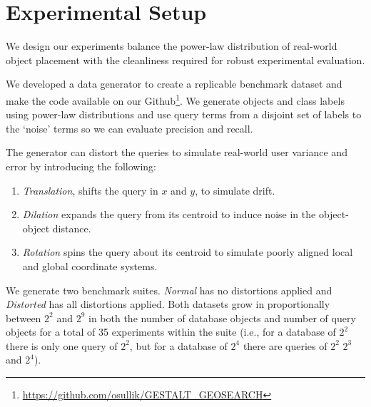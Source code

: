 \section{Experimental Setup}
\label{section:experimental_setup}


\par{
    We design our experiments balance the power-law distribution of real-world object placement with the cleanliness required for robust experimental evaluation. 
    }  
    
\par{
    We developed a data generator to create a replicable benchmark dataset and make the code available on our Github\footnote{\url{https://github.com/osullik/GESTALT_GEOSEARCH}}. We generate objects and class labels using power-law distributions and use query terms from a disjoint set of labels to the `noise' terms so we can evaluate precision and recall.
    }
   
\par{
    The generator can distort the queries to simulate real-world user variance and error by introducing the following:
    \begin{enumerate}
        \item \textit{Translation}, shifts the query in $x$ and $y$, to simulate drift.
        \item \textit{Dilation} expands the query from its centroid to induce noise in the object-object distance.
        \item \textit{Rotation} spins the query about its centroid to simulate poorly aligned local and global coordinate systems.
    \end{enumerate}
    }
\par{
    We generate two benchmark suites. \textit{Normal} has no distortions applied and \textit{Distorted} has all distortions applied. 
    Both datasets grow in proportionally between $2^2$ and $2^9$ in both the number of database objects and number of query objects for a total of 35 experiments within the suite (i.e., for a database of $2^2$ there is only one query of $2^2$, but for a database of $2^4$ there are queries of $2^2$ $2^3$ and $2^4$).
}


